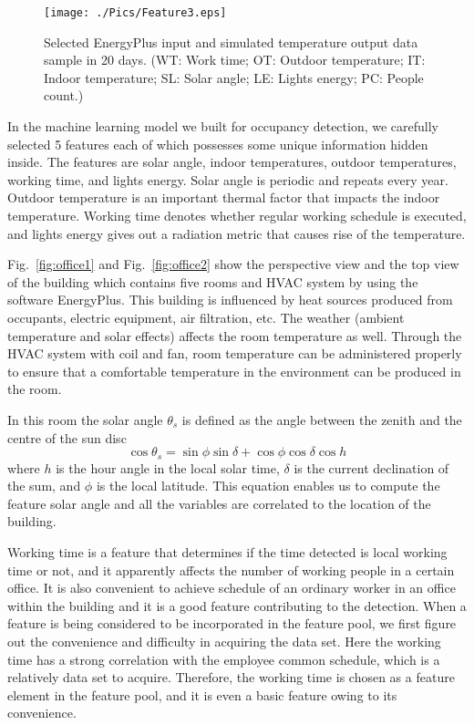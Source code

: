 \begin{figure}[h]
\centering
\texttt{[image: ./Pics/Feature3.eps]}
\caption{Selected EnergyPlus input and simulated temperature output data sample in 20 days. (WT: Work time; OT: Outdoor temperature; IT: Indoor temperature; SL: Solar angle; LE: Lights energy; PC: People count.)}
\label{fig:feature}
\end{figure}

In the machine learning model we built for occupancy detection, we carefully
selected 5 features each of which possesses some unique information hidden
inside. The features are solar angle, indoor temperatures, outdoor
temperatures, working time, and lights energy.  Solar angle is periodic and
repeats every year. Outdoor temperature is an important thermal factor that
impacts the indoor temperature. Working time denotes whether regular working
schedule is executed, and lights energy gives out a radiation metric that
causes rise of the temperature.

Fig.~\ref{fig:office1} and Fig.~\ref{fig:office2} show the perspective view
and the top view of the building which contains five rooms and HVAC
system by using the software EnergyPlus. This building is
influenced by heat sources produced from occupants, electric
equipment, air filtration, etc. The weather (ambient temperature and
solar effects) affects the room temperature as well. Through the HVAC
system with coil and fan, room temperature can be administered
properly to ensure that a comfortable temperature in the environment
can be produced in the room.

In this room the solar angle ${\theta _s}$ is defined as the angle between the
zenith and the centre of the sun disc
\begin{equation}
    \cos {\theta _s} = \sin \phi \sin \delta  + \cos \phi \cos \delta \cos h
\end{equation}
where $h$ is the hour angle in the local solar time, $\delta$ is the
current declination of the sum, and $\phi$ is the local latitude. This
equation enables us to compute the feature solar angle and all the
variables are correlated to the location of the building.

Working time is a feature that determines if the time detected is
local working time or not, and it apparently affects the number of
working people in a certain office. It is also convenient to achieve
schedule of an ordinary worker in an office within the building and it
is a good feature contributing to the detection. When a feature is
being considered to be incorporated in the feature pool, we first
figure out the convenience and difficulty in acquiring the data set.
Here the working time has a strong correlation with the employee common
schedule, which is a relatively data set to acquire. Therefore, the
working time is chosen as a feature element in the feature pool, and
it is even a basic feature owing to its convenience.

